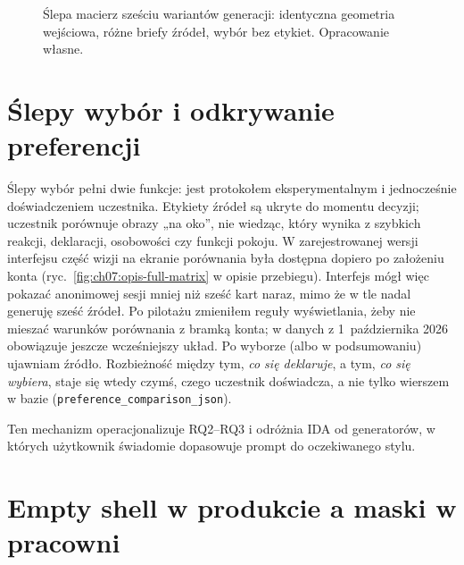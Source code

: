 \begin{figure}[htbp]
  \centering
  \caption{Ślepa macierz sześciu wariantów generacji: identyczna geometria wejściowa, różne briefy źródeł, wybór bez etykiet. Opracowanie własne.}
  \label{fig:ch07:matrix}
\end{figure}

\section{Ślepy wybór i odkrywanie preferencji}
\label{ch07:sec:slepy-wybor}

Ślepy wybór pełni dwie funkcje: jest protokołem eksperymentalnym i jednocześnie doświadczeniem uczestnika. Etykiety źródeł są ukryte do momentu decyzji; uczestnik porównuje obrazy „na oko”, nie wiedząc, który wynika z szybkich reakcji, deklaracji, osobowości czy funkcji pokoju.
W zarejestrowanej wersji interfejsu część wizji na ekranie porównania była dostępna dopiero po założeniu konta (ryc.~\ref{fig:ch07:opis-full-matrix} w opisie przebiegu). Interfejs mógł więc pokazać anonimowej sesji mniej niż sześć kart naraz, mimo że w tle nadal generuję sześć źródeł. Po pilotażu zmieniłem reguły wyświetlania, żeby nie mieszać warunków porównania z bramką konta; w danych z 1~października 2026 obowiązuje jeszcze wcześniejszy układ.
Po wyborze (albo w podsumowaniu) ujawniam źródło. Rozbieżność między tym, \emph{co się deklaruje}, a tym, \emph{co się wybiera}, staje się wtedy czymś, czego uczestnik doświadcza, a nie tylko wierszem w bazie (\texttt{preference\_comparison\_json}).

Ten mechanizm operacjonalizuje RQ2--RQ3 i odróżnia IDA od generatorów, w których użytkownik świadomie dopasowuje prompt do oczekiwanego stylu.

\section{Empty shell w produkcie a maski w pracowni}
\label{ch07:sec:empty-shell}

